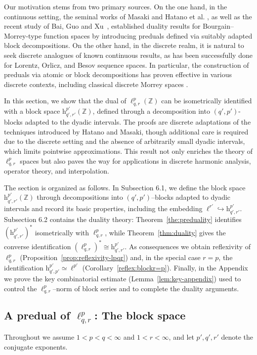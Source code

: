 \documentclass[preprint,12pt]{elsarticle}
\begin{document}
Our motivation stems from two primary sources. On the one hand, in the continuous setting, the seminal works of Masaki and Hatano et al. \cite{masaki2016two, hatano2004bourgain}, as well as the recent study of Bai, Guo and Xu~\cite{preduals of Banach space valued}, established duality results for Bourgain–Morrey-type function spaces by introducing preduals defined via suitably adapted block decompositions. On the other hand, in the discrete realm, it is natural to seek discrete analogues of known continuous results, as has been successfully done for Lorentz, Orlicz, and Besov sequence spaces. In particular, the construction of preduals via atomic or block decompositions has proven effective in various discrete contexts, including classical discrete Morrey spaces \cite{MorreySeq2020}.

In this section, we show that the dual of \(\ell^{p}_{q,r}(\mathbb{Z})\) can be isometrically identified with a block space \(\mathrm{h}^{p'}_{q',r'}(\mathbb{Z})\), defined through a decomposition into \((q',p')\)-blocks adapted to the dyadic intervals. The proofs are discrete adaptations of the techniques introduced by Hatano and Masaki, though additional care is required due to the discrete setting and the absence of arbitrarily small dyadic intervals, which limits pointwise approximations. This result not only enriches the theory of \(\ell^{p}_{q,r}\) spaces but also paves the way for applications in discrete harmonic analysis, operator theory, and interpolation.

The section is organized as follows. In Subsection 6.1, we define the block space
$\mathrm{h}^{p'}_{q',r'}(\mathbb{Z})$ through decompositions into $(q',p')$--blocks adapted
to dyadic intervals and record its basic properties, including the embedding
$\ell^{r'}\hookrightarrow \mathrm{h}^{p'}_{q',r'}$.
Subsection 6.2 contains the duality theory: Theorem~\ref{the:preduality} identifies
$(\mathrm{h}^{p'}_{q',r'})^*$ isometrically with $\ell^{p}_{q,r}$, while
Theorem~\ref{thm:duality} gives the converse identification $(\ell^{p}_{q,r})^*\cong
\mathrm{h}^{p'}_{q',r'}$.
As consequences we obtain reflexivity of $\ell^{p}_{q,r}$ (Proposition~\ref{prop:reflexivity-lpqr})
and, in the special case $r=p$, the identification $\mathrm{h}^{p'}_{q',p'}\simeq \ell^{p'}$
(Corollary~\ref{reflex:blockr=p}).
Finally, in the Appendix we prove the key combinatorial estimate (Lemma~\ref{lem:key-appendix})
used to control the $\ell^{p}_{q,r}$--norm of block series and to complete the duality arguments.


\subsection{A predual of $\ell^{p}_{q,r}$: The block space} 
  Throughout we assume $1<p<q<\infty$ and $1<r<\infty$, and let $p',q',r'$ denote the conjugate exponents.
\end{document}
